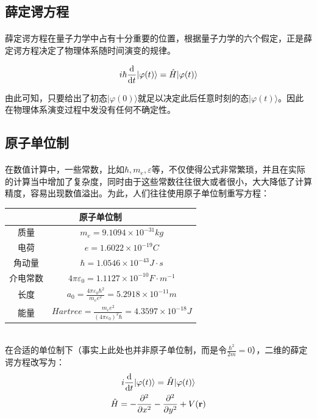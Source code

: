 \begin{multicols}{2}
\nolinenumbers
\section{薛定谔方程}
\paragraph{}薛定谔方程在量子力学中占有十分重要的位置，根据量子力学的六个假定，正是薛定谔方程决定了物理体系随时间演变的规律\cite{QUANTUM}。
\begin{tauenv}[frametitle=薛定谔方程]
    \begin{align}
        i\hbar\dv{ }{t}|\varphi(t)\rangle=\hat{H}|\varphi(t)\rangle
    \end{align}
\end{tauenv}
由此可知，只要给出了初态$|\varphi(0)\rangle$就足以决定此后任意时刻的态$|\varphi(t)\rangle$。因此在物理体系演变过程中发没有任何不确定性。
\subsection{原子单位制}
\paragraph{}在数值计算中，一些常数，比如$\hbar,m_e,\varepsilon$等，不仅使得公式非常繁琐，并且在实际的计算当中增加了复杂度，同时由于这些常数往往很大或者很小，大大降低了计算精度，容易出现数值溢出。为此，人们往往使用原子单位制重写方程：\cite{sb}
\begin{tabular}{c|c}
    \toprule
    \multicolumn{2}{c}{原子单位制} \\[2pt]
    \hline
    质量&$m_e=9.1094\times 10^{-31}kg$\\
    电荷&$e=1.6022\times 10^{-19}C$\\
    角动量&$\hbar=1.0546\times 10^{-43}J\cdot s$\\
    介电常数&$4\pi\varepsilon_0=1.1127\times 10^{-10}F\cdot m^{-1}$\\
    长度&$a_0=\frac{4\pi\varepsilon_0\hbar^2}{m_ee^2}=5.2918\times 10^{-11}m$\\
    能量&$Hartree=\frac{m_ee^2}{(4\pi\varepsilon_0)^2\hbar}=4.3597\times 10^{-18}J$\\
    \bottomrule
\end{tabular}
\\
在合适的单位制下（事实上此处也并非原子单位制，而是令$\frac{\hbar^2}{2m}=0$），二维的薛定谔方程改写为：
\begin{equation}
    \begin{gathered}
        i\dv{}{t}|\varphi(t)\rangle=\hat{H}|\varphi(t)\rangle\\
        \hat{H}=-\pdv[2]{}{x}-\pdv[2]{}{y}+V(\mathbf{r})\label{se}
    \end{gathered}
\end{equation}

\end{multicols}
